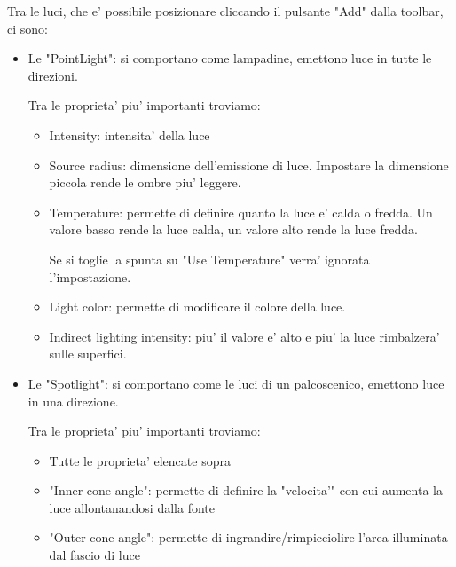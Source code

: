             Tra le luci, che e' possibile posizionare cliccando il pulsante "Add" dalla toolbar, ci sono:
            \begin{itemize}
                \item Le "PointLight": si comportano come lampadine, emettono luce in tutte le direzioni.

                    Tra le proprieta' piu' importanti troviamo:
                    \begin{itemize}
                        \item Intensity: intensita' della luce
                        \item Source radius: dimensione dell'emissione di luce. Impostare la dimensione piccola rende le ombre piu' leggere.
                        \item Temperature: permette di definire quanto la luce e' calda o fredda. Un valore basso rende la luce calda, un valore alto rende la luce fredda.

                            \begin{notebox}
                                Se si toglie la spunta su "Use Temperature" verra' ignorata l'impostazione.
                            \end{notebox}

                        \item Light color: permette di modificare il colore della luce.
                        \item Indirect lighting intensity: piu' il valore e' alto e piu' la luce rimbalzera' sulle superfici.
                    \end{itemize}

                \item Le "Spotlight": si comportano come le luci di un palcoscenico, emettono luce in una direzione.

                    Tra le proprieta' piu' importanti troviamo:
                    \begin{itemize}
                        \item Tutte le proprieta' elencate sopra
                        \item "Inner cone angle": permette di definire la "velocita'" con cui aumenta la luce allontanandosi dalla fonte
                        \item "Outer cone angle": permette di ingrandire/rimpicciolire l'area illuminata dal fascio di luce
                    \end{itemize}


\end{itemize}

